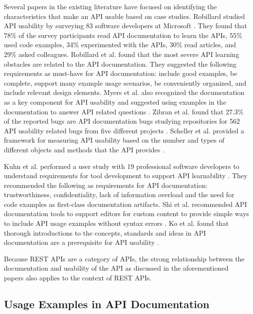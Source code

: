 Several papers in the existing literature have focused on identifying the characteristics that make an API usable based on case studies. Robillard studied API usability by surveying 83 software developers at Microsoft \cite{Robillard_a_field_study}. They found that 78\% of the survey participants read API documentation to learn the APIs, 55\% used code examples, 34\% experimented with the APIs, 30\% read articles, and 29\% asked colleagues. Robillard et al. found that the most severe API learning obstacles are related to the API documentation. They suggested the following requirements as must-have for API documentation: include good examples, be complete, support many example usage scenarios, be conveniently organized, and include relevant design elements. Myers et al. also recognized the documentation as a key component for API usability and suggested using examples in the documentation to answer API related questions \cite{Myers_improving_api}. Zibran et al. found that 27.3\% of the reported bugs are API documentation bugs studying repositories for 562 API usability related bugs from five different projects \cite{zibran2011useful}. Scheller et al. provided a framework for measuring API usability based on the number and types of different objects and methods that the API provides \cite{scheller2015automated}.

Kuhn et al. performed a user study with 19 professional software developers to understand requirements for tool development to support API learnability \cite{Kuhn_on_designing}. They recommended the following as requirements for API documentation: trustworthiness, confidentiality, lack of information overload and the need for code examples as first-class documentation artifacts. Shi et al. recommended API documentation tools to support editors for custom content to provide simple ways to include API usage examples without syntax errors \cite{shi2011empirical}. Ko et al. found that thorough introductions to the concepts, standards and ideas in API documentation are a prerequisite for API usability \cite{ko2011role}.

Because REST APIs are a category of APIs, the strong relationship between the documentation and usability of the API as discussed in the aforementioned papers also applies to the context of REST APIs.

\subsection{Usage Examples in API Documentation} %

